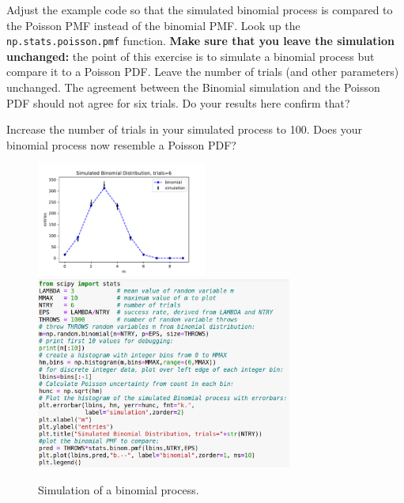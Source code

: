 \begin{samepage}
\begin{plot} \end{plot}
Adjust the example code so that the simulated binomial process is
compared to the Poisson PMF instead of the binomial PMF.  Look up the
{\tt np.stats.poisson.pmf} function.  {\bf Make sure that you leave
  the simulation unchanged:} the point of this exercise is to simulate
a binomial process but compare it to a Poisson PDF.  Leave the number
of trials (and other parameters) unchanged.  The agreement between the
Binomial simulation and the Poisson PDF should not agree for six
trials.  Do your results here confirm that?
\end{samepage}

\begin{samepage}
\begin{plot} \end{plot}
Increase the number of trials in your simulated process to 100.  Does
your binomial process now resemble a Poisson PDF?
\end{samepage}

\begin{figure}[htbp]
\begin{center}
  \includegraphics[width=0.50\textwidth]{figs/limits/binomial.pdf}
  \includegraphics[width=0.75\textwidth]{figs/limits/binomial-code.png} 
\caption{Simulation of a binomial process.}
\label{fig:binom}
\end{center}
\end{figure}

